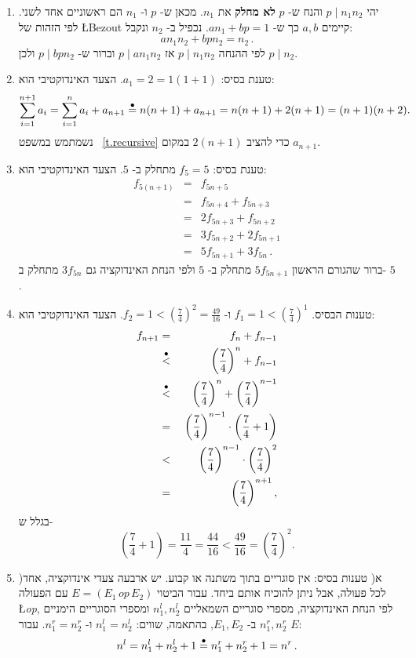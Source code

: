 \begin{enumerate}
\item
יהי
$p \mid n_1n_2$ 
והנח ש-%
$p$
\textbf{לא מחלק}
את
$n_1$.
מכאן ש-%
$p$
ו-%
$n_1$
הם ראשוניים אחד לשני. לפי הזהות של 
\L{Bezout}
קיימים
$a,b$
כך ש-%
$an_1+bp=1$.
נכפיל ב-%
$n_2$
ונקבל:
\[
an_1n_2 + bpn_2 = n_2\,.
\]
לפי ההנחה
$p \mid n_1n_2$
אז
$p \mid an_1n_2$
וברור ש-%
$p \mid bpn_2$
ולכן
$p\mid n_2$.

\item
טענת בסיס:
$a_1=2=1(1+1)$.
הצעד האינדוקטיבי הוא:
\[
\sum_{i=1}^{n+1}a_i=\sum_{i=1}^n a_i+a_{n+1}\stackrel{\bullet}{=}{}n(n+1)+a_{n+1}=n(n+1)+2(n+1)=(n+1)(n+2).
\]
נשמתמש במשפט~%
\ref{t.recursive}
כדי להציב
$2(n+1)$
במקום
$a_{n+1}$.

\item 
טענת בסיס:
$f_5=5$ 
מתחלק ב-%
$5$.
הצעד האינדוקטיבי הוא:
\begin{eqnarray*}
f_{5(n+1)} &=& f_{5n+5}\\
&=& f_{5n+4}+f_{5n+3}\\
&=& 2f_{5n+3}+f_{5n+2}\\
&=& 3f_{5n+2}+2f_{5n+1}\\
&=& 5f_{5n+1}+3f_{5n}\,.
\end{eqnarray*}
ברור שהגורם הראשון 
$5f_{5n+1}$
מתחלק ב-%
$5$
ולפי הנחת האינדוקציה
גם
$3f_{5n}$
מתחלק ב-%
$5$.

\item 
טענות הבסיס.
$f_1=1<(\frac{7}{4})^1$
ו-%
$f_2=1<(\frac{7}{4})^2=\frac{49}{16}$.
הצעד האינדוקטיבי הוא:
\begin{eqnarray*}
f_{n+1}&=&f_n+f_{n-1}\\
&\stackrel{\bullet}{<}{}&\left(\frac{7}{4}\right)^n + f_{n-1}\\
&\stackrel{\bullet}{<}{}&\left(\frac{7}{4}\right)^n + \left(\frac{7}{4}\right)^{n-1}\\
&=&\left(\frac{7}{4}\right)^{n-1}\cdot\left(\frac{7}{4}+1\right)\\
&<&\left(\frac{7}{4}\right)^{n-1}\cdot\left(\frac{7}{4}\right)^2\\
&=&\left(\frac{7}{4}\right)^{n+1},
\end{eqnarray*}
בגלל ש-%
\[
\left(\frac{7}{4}+1\right) = \frac{11}{4} = \frac{44}{16}<\frac{49}{16}=\left(\frac{7}{4}\right)^2.
\]

\item
)א( טענות בסיס: אין סוגריים בתוך משתנה או קבוע. יש ארבעה צעדי אינדוקציה, אחד לכל פעולה, אבל ניתן להוכיח אותם ביחד. עבור הביטוי
$E=(E_1 \,\textit{op}\, E_2)$
עם הפעולה
\L{\textit{op}},
לפי הנחת האינדוקציה, מספרי סוגריים השמאליים
$n_1^l,n_2^l$
ומספרי הסוגריים הימניים
$n_1^r,n_2^r$
ב-%
$E_1,E_2$,
בהתאמה, שווים:
$n_1^l=n_2^l$
ו-%
$n_1^r=n_2^r$.
עבור
$E$:
\[
n^l=n_1^l+n_2^l+1\stackrel{\bullet}{=}{}n_1^r+n_2^r+1=n^r\,.
\]


\end{enumerate}
